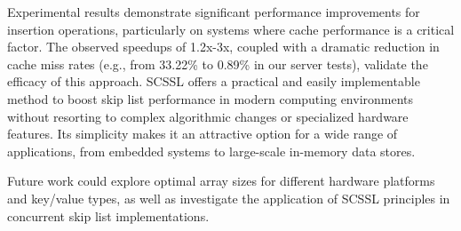 \documentclass[sigconf]{acmart}
\begin{document}
Experimental results demonstrate significant performance improvements for insertion operations, particularly on systems where cache performance is a critical factor. The observed speedups of 1.2x-3x, coupled with a dramatic reduction in cache miss rates (e.g., from 33.22\% to 0.89\% in our server tests), validate the efficacy of this approach. SCSSL offers a practical and easily implementable method to boost skip list performance in modern computing environments without resorting to complex algorithmic changes or specialized hardware features. Its simplicity makes it an attractive option for a wide range of applications, from embedded systems to large-scale in-memory data stores.

Future work could explore optimal array sizes for different hardware platforms and key/value types, as well as investigate the application of SCSSL principles in concurrent skip list implementations.




\end{document}
